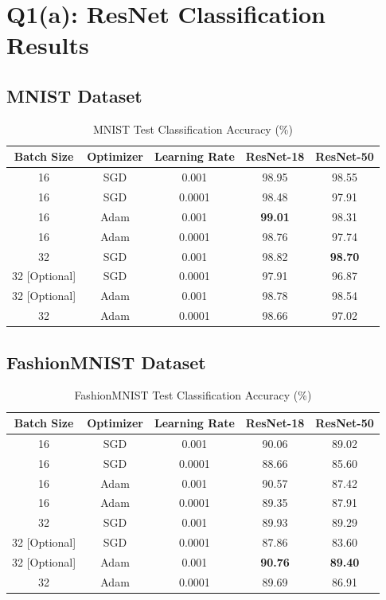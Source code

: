 \documentclass[11pt,a4paper]{article}
\begin{document}
\section{Q1(a): ResNet Classification Results}

\subsection{MNIST Dataset}

\begin{table}[H]
\centering
\caption{MNIST Test Classification Accuracy (\%)}
\begin{tabular}{|c|c|c|c|c|}
\hline
\textbf{Batch Size} & \textbf{Optimizer} & \textbf{Learning Rate} & \textbf{ResNet-18} & \textbf{ResNet-50} \\
\hline
16 & SGD & 0.001 & 98.95 & 98.55 \\
\hline
16 & SGD & 0.0001 & 98.48 & 97.91 \\
\hline
16 & Adam & 0.001 & \textbf{99.01} & 98.31 \\
\hline
16 & Adam & 0.0001 & 98.76 & 97.74 \\
\hline
32 & SGD & 0.001 & 98.82 & \textbf{98.70} \\
\hline
32 [Optional] & SGD & 0.0001 & 97.91 & 96.87 \\
\hline
32 [Optional] & Adam & 0.001 & 98.78 & 98.54 \\
\hline
32 & Adam & 0.0001 & 98.66 & 97.02 \\
\hline
\end{tabular}
\end{table}

\subsection{FashionMNIST Dataset}

\begin{table}[H]
\centering
\caption{FashionMNIST Test Classification Accuracy (\%)}
\begin{tabular}{|c|c|c|c|c|}
\hline
\textbf{Batch Size} & \textbf{Optimizer} & \textbf{Learning Rate} & \textbf{ResNet-18} & \textbf{ResNet-50} \\
\hline
16 & SGD & 0.001 & 90.06 & 89.02 \\
\hline
16 & SGD & 0.0001 & 88.66 & 85.60 \\
\hline
16 & Adam & 0.001 & 90.57 & 87.42 \\
\hline
16 & Adam & 0.0001 & 89.35 & 87.91 \\
\hline
32 & SGD & 0.001 & 89.93 & 89.29 \\
\hline
32 [Optional] & SGD & 0.0001 & 87.86 & 83.60 \\
\hline
32 [Optional] & Adam & 0.001 & \textbf{90.76} & \textbf{89.40} \\
\hline
32 & Adam & 0.0001 & 89.69 & 86.91 \\
\hline
\end{tabular}
\end{table}
\end{document}
